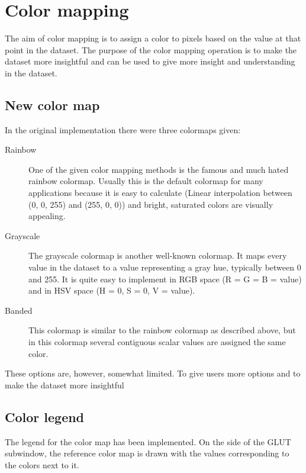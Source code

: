 \section{Color mapping}
	\label{sec:color_mapping}
	The aim of color mapping is to assign a color to pixels based on the value at that point in the dataset. The purpose of the color mapping operation is to make the dataset more insightful and can be used to give more insight and understanding in the dataset.
	\subsection*{New color map}
		In the original implementation there were three colormaps given:
		\begin{description}
			\item[Rainbow] One of the given color mapping methods is the famous and much hated\cite{RainbowMisleading} rainbow colormap. Usually this is the default colormap for many applications because it is easy to calculate (Linear interpolation between (0, 0, 255) and (255, 0, 0)) and bright, saturated colors are visually appealing.
			\item[Grayscale] The grayscale colormap is another well-known colormap. It maps every value in the dataset to a value representing a gray hue, typically between 0 and 255. It is quite easy to implement in RGB space (R = G = B = value) and in HSV space (H = 0, S = 0, V = value).
			\item[Banded] This colormap is similar to the rainbow colormap as described above, but in this colormap several contiguous scalar values are assigned the same color. 
		\end{description}
		These options are, however, somewhat limited. To give users more options and to make the dataset more insightful 
	\subsection*{Color legend}
		The legend for the color map has been implemented.
		On the side of the GLUT subwindow, the reference color map is drawn with the values corresponding to the colors next to it.
